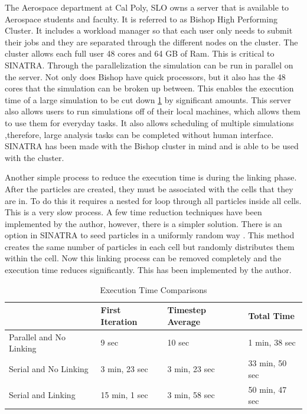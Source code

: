 \indent The Aerospace department at Cal Poly, SLO owns a server that is available to Aerospace students and faculty. It is referred to as Bishop High Performing Cluster\cite{hpc}. It includes a workload manager so that each user only needs to submit their jobs and they are separated through the different nodes on the cluster. The cluster allows each full user 48 cores and 64 GB of Ram\cite{hpc}. This is critical to SINATRA. Through the parallelization the simulation can be run in parallel on the server. Not only does Bishop have quick processors, but it also has the 48 cores that the simulation can be broken up between. This enables the execution time of a large simulation to be cut down \ref{tab:Timing} by significant amounts. This server also allows users to run simulations off of their local machines, which allows them to use them for everyday tasks. It also allows scheduling of multiple simulations ,therefore, large analysis tasks can be completed without human interface. SINATRA has been made with the Bishop cluster in mind and is able to be used with the cluster. \par




\indent Another simple process to reduce the execution time is during the linking phase. After the particles are created, they must be associated with the cells that they are in. To do this it requires a nested for loop  through all particles inside all cells. This is a very slow process. A few time reduction techniques have been implemented by the author, however, there is a simpler solution. There is an option in SINATRA to seed particles in a uniformly random way \cite{Galvez2018a}. This method creates the same number of particles in each cell but randomly distributes them within the cell. Now this linking process can be removed completely and the execution time reduces significantly. This has been implemented by the author. \par

\begin{table}
\label{tab:Timing}
\caption{Execution Time Comparisons}
\vspace{0.3cm}
\begin{center}
\begin{tabular}{|l|l|l|l|}
\hline
                             & First Iteration & Timestep Average & Total Time     \\ \hline
Parallel and No Linking & 9 sec           & 10 sec           & 1 min, 38 sec  \\ \hline
Serial and No Linking   & 3 min, 23 sec   & 3 min, 23 sec    & 33 min, 50 sec \\ \hline
Serial and Linking      & 15 min, 1 sec   &  3 min, 58 sec   &   50 min, 47 sec             \\ \hline
\end{tabular}
\end{center}
\end{table}

